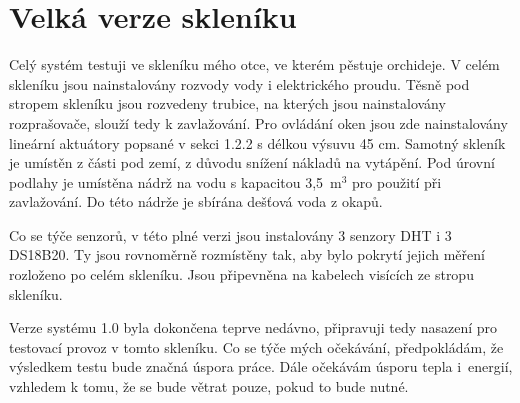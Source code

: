 \chapter{Velká verze skleníku}
Celý systém testuji ve skleníku mého otce, ve kterém pěstuje orchideje.
V celém skleníku jsou nainstalovány rozvody vody i elektrického proudu.
Těsně pod stropem skleníku jsou rozvedeny trubice, na kterých jsou nainstalovány rozprašovače, slouží tedy k zavlažování.
Pro ovládání oken jsou zde nainstalovány lineární aktuátory popsané v sekci 1.2.2 s délkou výsuvu 45 cm.
Samotný skleník je umístěn z části pod zemí, z důvodu snížení nákladů na vytápění.
Pod úrovní podlahy je umístěna nádrž na vodu s kapacitou 3,5~m$^3$ pro použití při zavlažování.
Do této nádrže je sbírána dešťová voda z okapů.

Co se týče senzorů, v této plné verzi jsou instalovány 3 senzory DHT i 3 DS18B20.
Ty jsou rovnoměrně rozmístěny tak, aby bylo pokrytí jejich měření rozloženo po celém skleníku.
Jsou připevněna na kabelech visících ze stropu skleníku.

Verze systému 1.0 byla dokončena teprve nedávno, připravuji tedy nasazení pro testovací provoz v tomto skleníku.
Co se týče mých očekávání, předpokládám, že výsledkem testu bude značná úspora práce.
Dále očekávám úsporu tepla i~energií, vzhledem k tomu, že se bude větrat pouze, pokud to bude nutné.




	
